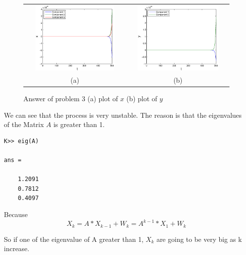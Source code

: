 \documentclass[14pt,letterpaper] {article}
\begin{document}
\begin{figure}
\begin{center}
\begin{tabular}{cc}
\includegraphics[width=2.4in, height=1.4in]{3plotx.eps}&
\includegraphics[width=2.4in, height=1.4in]{3ploty.eps}\\
(a) & (b) \\
\end{tabular}
\caption{Answer of problem 3 (a) plot of $x$ (b) plot of $y$}
\end{center}
\end{figure}

We can see that the process is very unstable. The reason is that the eigenvalues of the Matrix $A$ is greater than 1.

\begin{lstlisting}
K>> eig(A)

ans =

    1.2091
    0.7812
    0.4097

\end{lstlisting}

Because 
$$
X_k=A*X_{k-1}+W_k=A^{k-1}*X_1+W_k
$$ 

So if one of the eigenvalue of A greater than 1, $X_k$ are going to be very big as k increase. 
\end{document}
